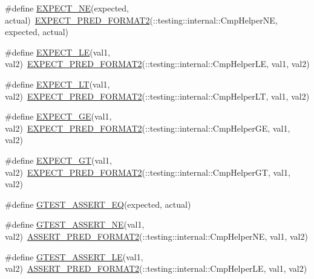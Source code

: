 \begin{DoxyCompactItemize}
\item 
\#define \hyperlink{fused-src_2gtest_2gtest_8h_adb8a724f2c5c63ead11073c21fd51198}{\-E\-X\-P\-E\-C\-T\-\_\-\-N\-E}(expected, actual)~\hyperlink{gtest__pred__impl_8h_af0141918615a5e2d5247e9cda8324dae}{\-E\-X\-P\-E\-C\-T\-\_\-\-P\-R\-E\-D\-\_\-\-F\-O\-R\-M\-A\-T2}(\-::testing\-::internal\-::\-Cmp\-Helper\-N\-E, expected, actual)
\item 
\#define \hyperlink{fused-src_2gtest_2gtest_8h_ae0f265632323b4a07b585dcfde10f60a}{\-E\-X\-P\-E\-C\-T\-\_\-\-L\-E}(val1, val2)~\hyperlink{gtest__pred__impl_8h_af0141918615a5e2d5247e9cda8324dae}{\-E\-X\-P\-E\-C\-T\-\_\-\-P\-R\-E\-D\-\_\-\-F\-O\-R\-M\-A\-T2}(\-::testing\-::internal\-::\-Cmp\-Helper\-L\-E, val1, val2)
\item 
\#define \hyperlink{fused-src_2gtest_2gtest_8h_af28c06b2b5e8dee151896f299f6610cf}{\-E\-X\-P\-E\-C\-T\-\_\-\-L\-T}(val1, val2)~\hyperlink{gtest__pred__impl_8h_af0141918615a5e2d5247e9cda8324dae}{\-E\-X\-P\-E\-C\-T\-\_\-\-P\-R\-E\-D\-\_\-\-F\-O\-R\-M\-A\-T2}(\-::testing\-::internal\-::\-Cmp\-Helper\-L\-T, val1, val2)
\item 
\#define \hyperlink{fused-src_2gtest_2gtest_8h_ab7a0ff4bfa4d9b27baa118d8b0756ca0}{\-E\-X\-P\-E\-C\-T\-\_\-\-G\-E}(val1, val2)~\hyperlink{gtest__pred__impl_8h_af0141918615a5e2d5247e9cda8324dae}{\-E\-X\-P\-E\-C\-T\-\_\-\-P\-R\-E\-D\-\_\-\-F\-O\-R\-M\-A\-T2}(\-::testing\-::internal\-::\-Cmp\-Helper\-G\-E, val1, val2)
\item 
\#define \hyperlink{fused-src_2gtest_2gtest_8h_aa8bc8320813e1abb0016129b636e3b27}{\-E\-X\-P\-E\-C\-T\-\_\-\-G\-T}(val1, val2)~\hyperlink{gtest__pred__impl_8h_af0141918615a5e2d5247e9cda8324dae}{\-E\-X\-P\-E\-C\-T\-\_\-\-P\-R\-E\-D\-\_\-\-F\-O\-R\-M\-A\-T2}(\-::testing\-::internal\-::\-Cmp\-Helper\-G\-T, val1, val2)
\item 
\#define \hyperlink{fused-src_2gtest_2gtest_8h_ab49d537c37c637256307f8d55154050c}{\-G\-T\-E\-S\-T\-\_\-\-A\-S\-S\-E\-R\-T\-\_\-\-E\-Q}(expected, actual)
\item 
\#define \hyperlink{fused-src_2gtest_2gtest_8h_a6fa9bb2b6731eba8f481e40e9e4931b3}{\-G\-T\-E\-S\-T\-\_\-\-A\-S\-S\-E\-R\-T\-\_\-\-N\-E}(val1, val2)~\hyperlink{gtest__pred__impl_8h_ac452685a1a98ea3d96eb956a062ee210}{\-A\-S\-S\-E\-R\-T\-\_\-\-P\-R\-E\-D\-\_\-\-F\-O\-R\-M\-A\-T2}(\-::testing\-::internal\-::\-Cmp\-Helper\-N\-E, val1, val2)
\item 
\#define \hyperlink{fused-src_2gtest_2gtest_8h_abef04dcd4a0259d378de7b3b3ffb6730}{\-G\-T\-E\-S\-T\-\_\-\-A\-S\-S\-E\-R\-T\-\_\-\-L\-E}(val1, val2)~\hyperlink{gtest__pred__impl_8h_ac452685a1a98ea3d96eb956a062ee210}{\-A\-S\-S\-E\-R\-T\-\_\-\-P\-R\-E\-D\-\_\-\-F\-O\-R\-M\-A\-T2}(\-::testing\-::internal\-::\-Cmp\-Helper\-L\-E, val1, val2)

\end{DoxyCompactItemize}
